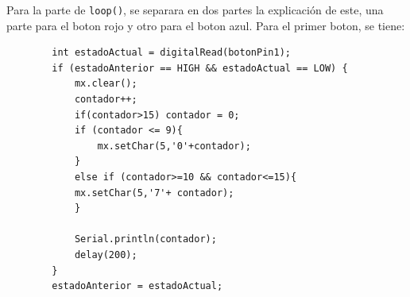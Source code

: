 \clearpage
Para la parte de \texttt{loop()}, se separara en dos partes la explicación de este, una parte para el boton rojo y otro para el boton azul. Para el primer boton, se tiene:

\begin{listing}[H]
    \begin{verbatim}
        int estadoActual = digitalRead(botonPin1);
        if (estadoAnterior == HIGH && estadoActual == LOW) {
            mx.clear();
            contador++;
            if(contador>15) contador = 0;
            if (contador <= 9){
                mx.setChar(5,'0'+contador);
            }
            else if (contador>=10 && contador<=15){
            mx.setChar(5,'7'+ contador);
            }
    
            Serial.println(contador);
            delay(200); 
        }
        estadoAnterior = estadoActual; 
    \end{verbatim}
\end{listing}